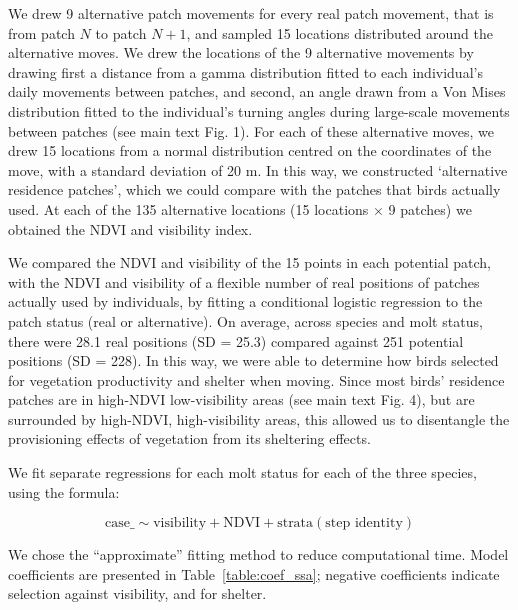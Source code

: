 We drew 9 alternative patch movements for every real patch movement, that is from patch $N$ to patch $N+1$, and sampled 15 locations distributed around the alternative moves.
We drew the locations of the 9 alternative movements by drawing first a distance from a gamma distribution fitted to each individual's daily movements between patches, and second, an angle drawn from a Von Mises distribution fitted to the individual's turning angles during large-scale movements between patches (see main text Fig. 1).
For each of these alternative moves, we drew 15 locations from a normal distribution centred on the coordinates of the move, with a standard deviation of 20 m.
In this way, we constructed `alternative residence patches', which we could compare with the patches that birds actually used.
At each of the 135 alternative locations (15 locations $\times$ 9 patches) we obtained the NDVI and visibility index.

We compared the NDVI and visibility of the 15 points in each potential patch, with the NDVI and visibility of a flexible number of real positions of patches actually used by individuals, by fitting a conditional logistic regression to the patch status (real or alternative).
On average, across species and molt status, there were 28.1 real positions (SD = 25.3) compared against 251 potential positions (SD = 228).
In this way, we were able to determine how birds selected for vegetation productivity and shelter when moving.
Since most birds' residence patches are in high-NDVI low-visibility areas (see main text Fig. 4), but are surrounded by high-NDVI, high-visibility areas, this allowed us to disentangle the provisioning effects of vegetation from its sheltering effects.

We fit separate regressions for each molt status for each of the three species, using the formula:
\begin{linenomath*}
$$ \text{case\_} \sim \text{visibility} + \text{NDVI} + \text{strata}(\text{step~identity}) $$
\end{linenomath*}
We chose the ``approximate'' fitting method to reduce computational time.
Model coefficients are presented in Table~\ref{table:coef_ssa}; negative coefficients indicate selection against visibility, and for shelter.

